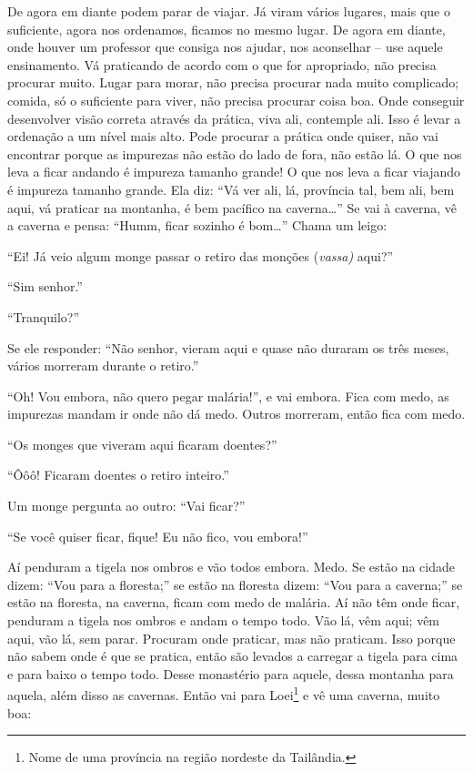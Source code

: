 De agora em diante podem parar de viajar. Já viram vários lugares,
mais que o suficiente, agora nos ordenamos, ficamos no mesmo lugar. De
agora em diante, onde houver um professor que consiga nos ajudar, nos
aconselhar – use aquele ensinamento. Vá praticando de acordo com o que
for apropriado, não precisa procurar muito. Lugar para morar, não
precisa procurar nada muito complicado; comida, só o suficiente para
viver, não precisa procurar coisa boa. Onde conseguir desenvolver visão
correta através da prática, viva ali, contemple ali. Isso é levar a
ordenação a um nível mais alto. Pode procurar a prática onde quiser,
não vai encontrar porque as impurezas não estão do lado de fora, não
estão lá. O que nos leva a ficar andando é impureza tamanho grande! O
que nos leva a ficar viajando é impureza tamanho grande. Ela diz: “Vá
ver ali, lá, província tal, bem ali, bem aqui, vá praticar na montanha,
é bem pacífico na caverna\ldots{}” Se vai à caverna, vê a caverna e pensa:
“Humm, ficar sozinho é bom\ldots{}” Chama um leigo: 

“Ei! Já veio algum monge passar o retiro das monções (\textit{vassa)
}aqui?”

“Sim senhor.” 

“Tranquilo?” 

Se ele responder: “Não senhor, vieram aqui e quase não duraram os
três meses, vários morreram durante o retiro.” 

“Oh! Vou embora, não quero pegar malária!”, e vai embora. Fica com
medo, as impurezas mandam ir onde não dá medo. Outros morreram, então
fica com medo. 

“Os monges que viveram aqui ficaram doentes?” 

“Ôôô! Ficaram doentes o retiro inteiro.”

Um monge pergunta ao outro: “Vai ficar?” 

“Se você quiser ficar, fique! Eu não fico, vou embora!”

Aí penduram a tigela nos ombros e vão todos embora. Medo. Se estão
na cidade dizem: “Vou para a floresta;” se estão na floresta dizem:
“Vou para a caverna;” se estão na floresta, na caverna, ficam com medo
de malária. Aí não têm onde ficar, penduram a tigela nos ombros e andam
o tempo todo. Vão lá, vêm aqui; vêm aqui, vão lá, sem parar. Procuram
onde praticar, mas não praticam. Isso porque não sabem onde é que se
pratica, então são levados a carregar a tigela para cima e para baixo o
tempo todo. Desse monastério para aquele, dessa montanha para aquela,
além disso as cavernas. Então vai para Loei\footnote{Nome de uma
província na região nordeste da Tailândia.} e vê uma caverna, muito
boa: 

